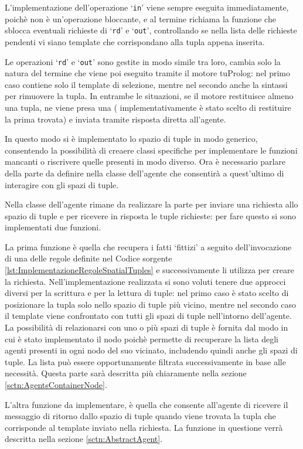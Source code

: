 L'implementazione dell'operazione `\texttt{in}' viene sempre eseguita immediatamente, poichè non è un'operazione bloccante, e al termine richiama la funzione che sblocca eventuali richieste di `\texttt{rd}' e `\texttt{out}', controllando se nella lista delle richieste pendenti vi siano template che corrispondano alla tupla appena inserita.

Le operazioni `\texttt{rd}' e `\texttt{out}' sono gestite in modo simile tra loro, cambia solo la natura del termine che viene poi eseguito tramite il motore tuProlog: nel primo caso contiene solo il template di selezione, mentre nel secondo anche la sintassi per rimuovere la tupla.
In entrambe le situazioni, se il motore restituisce almeno una tupla, ne viene presa una ( implementativamente è stato scelto di restituire la prima trovata) e inviata tramite risposta diretta all'agente.

In questo modo si è implementato lo spazio di tuple in modo generico, consentendo la possibilità di creaere classi specifiche per implementare le funzioni mancanti o riscrivere quelle presenti in modo diverso.
Ora è necessario parlare della parte da definire nella classe dell'agente che consentirà a quest'ultimo di interagire con gli spazi di tuple.

Nella classe dell'agente rimane da realizzare la parte per inviare una richiesta allo spazio di tuple e per ricevere in risposta le tuple richieste: per fare questo si sono implementati due funzioni.

La prima funzione è quella che recupera i fatti `fittizi' a seguito dell'invocazione di una delle regole definite nel Codice sorgente \ref{lst:ImplementazioneRegoleSpatialTuples} e successivamente li utilizza per creare la richiesta. Nell'implementazione realizzata si sono voluti tenere due approcci diversi per la scrittura e per la lettura di tuple: nel primo caso è stato scelto di posizionare la tupla solo nello spazio di tuple più vicino, mentre nel secondo caso il template viene confrontato con tutti gli spazi di tuple nell'intorno dell'agente.
La possibilità di relazionarsi con uno o più spazi di tuple è fornita dal modo in cui è stato implementato il nodo poichè permette di recuperare la lista degli agenti presenti in ogni nodo del suo vicinato, includendo quindi anche gli spazi di tuple. La lista può essere opportunamente filtrata successivamente in base alle necessità. Questa parte sarà descritta più chiaramente nella sezione \ref{sctn:AgentsContainerNode}.

L'altra funzione da implementare, è quella che consente all'agente di ricevere il messaggio di ritorno dallo spazio di tuple quando viene trovata la tupla che corrisponde al template inviato nella richiesta. La funzione in questione verrà descritta nella sezione \ref{sctn:AbstractAgent}.
